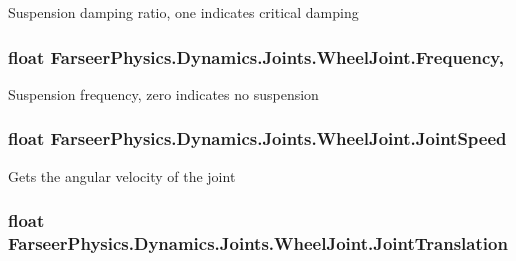 Suspension damping ratio, one indicates critical damping 

\hypertarget{class_farseer_physics_1_1_dynamics_1_1_joints_1_1_wheel_joint_a6ff4d519932477893f22e14f93a8a3e7}{
\subsubsection[{Frequency}]{\setlength{\rightskip}{0pt plus 5cm}float Farseer\+Physics.\+Dynamics.\+Joints.\+Wheel\+Joint.\+Frequency\hspace{0.3cm}{\ttfamily [get]}, {\ttfamily [set]}}}\label{class_farseer_physics_1_1_dynamics_1_1_joints_1_1_wheel_joint_a6ff4d519932477893f22e14f93a8a3e7}


Suspension frequency, zero indicates no suspension 

\hypertarget{class_farseer_physics_1_1_dynamics_1_1_joints_1_1_wheel_joint_aba2ae171523a4e7bc3995091255dcc10}{
\subsubsection[{Joint\+Speed}]{\setlength{\rightskip}{0pt plus 5cm}float Farseer\+Physics.\+Dynamics.\+Joints.\+Wheel\+Joint.\+Joint\+Speed\hspace{0.3cm}{\ttfamily [get]}}}\label{class_farseer_physics_1_1_dynamics_1_1_joints_1_1_wheel_joint_aba2ae171523a4e7bc3995091255dcc10}


Gets the angular velocity of the joint 

\hypertarget{class_farseer_physics_1_1_dynamics_1_1_joints_1_1_wheel_joint_aad96b5522262fc1d692987f4aa2ef748}{
\subsubsection[{Joint\+Translation}]{\setlength{\rightskip}{0pt plus 5cm}float Farseer\+Physics.\+Dynamics.\+Joints.\+Wheel\+Joint.\+Joint\+Translation\hspace{0.3cm}{\ttfamily [get]}}}\label{class_farseer_physics_1_1_dynamics_1_1_joints_1_1_wheel_joint_aad96b5522262fc1d692987f4aa2ef748}



